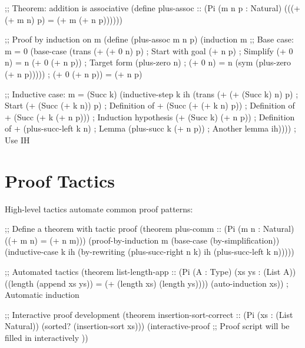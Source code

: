 \begin{example}
\begin{lambdustcode}
;; Theorem: addition is associative
(define plus-assoc :: (Pi (m n p : Natural) 
                          (((+ (+ m n) p) = (+ m (+ n p))))))

;; Proof by induction on m
(define (plus-assoc m n p)
  (induction m
    ;; Base case: m = 0
    (base-case 
      (trans (+ (+ 0 n) p)          ; Start with goal
             (+ n p)                 ; Simplify (+ 0 n) = n  
             (+ 0 (+ n p))           ; Target form
             (plus-zero n)           ; (+ 0 n) = n
             (sym (plus-zero (+ n p))))) ; (+ 0 (+ n p)) = (+ n p)
    
    ;; Inductive case: m = (Succ k)
    (inductive-step k ih
      (trans (+ (+ (Succ k) n) p)   ; Start
             (+ (Succ (+ k n)) p)    ; Definition of + 
             (Succ (+ (+ k n) p))    ; Definition of +
             (Succ (+ k (+ n p)))    ; Induction hypothesis  
             (+ (Succ k) (+ n p))    ; Definition of +
             (plus-succ-left k n)    ; Lemma
             (plus-succ k (+ n p))   ; Another lemma
             ih))))                  ; Use IH
\end{lambdustcode}
\end{example}

\section{Proof Tactics}
\label{sec:tactics}

High-level tactics automate common proof patterns:

\begin{example}
\begin{lambdustcode}
;; Define a theorem with tactic proof
(theorem plus-comm :: (Pi (m n : Natural) ((+ m n) = (+ n m)))
  (proof-by-induction m
    (base-case 
      (by-simplification))
    (inductive-case k ih
      (by-rewriting 
        (plus-succ-right n k)
        ih
        (plus-succ-left k n)))))

;; Automated tactics
(theorem list-length-app :: (Pi (A : Type) (xs ys : (List A))
                                ((length (append xs ys)) = 
                                 (+ (length xs) (length ys))))
  (auto-induction xs))      ; Automatic induction

;; Interactive proof development
(theorem insertion-sort-correct :: (Pi (xs : (List Natural))
                                      (sorted? (insertion-sort xs)))
  (interactive-proof
    ;; Proof script will be filled in interactively
    ))
\end{lambdustcode}
\end{example}

